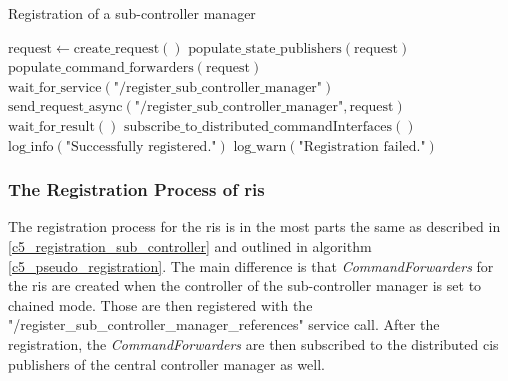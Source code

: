 \begin{algorithm}
	\caption{Registration of a sub-controller manager}
\begin{algorithmic}[1]
  \State $\text{request} \gets \text{create\_request}()$
  \State $\text{populate\_state\_publishers}(\text{request})$
  \State $\text{populate\_command\_forwarders}(\text{request})$
  \State $\text{wait\_for\_service}(\text{"/register\_sub\_controller\_manager"})$
  \State $\text{send\_request\_async}(\text{"/register\_sub\_controller\_manager"}, \text{request})$
  \State $\text{wait\_for\_result}()$
    \State $\text{subscribe\_to\_distributed\_commandInterfaces}()$
    \State $\text{log\_info}(\text{"Successfully registered."})$
  \Else
    \State $\text{log\_warn}(\text{"Registration failed."})$
  \EndIf
\EndProcedure
\end{algorithmic}
\label{c5_pseudo_registration}
\end{algorithm}

\subsubsection{The Registration Process of \Glspl{ri}}
The registration process for the \glspl{ri} is in the most parts the same as described in \autoref{c5_registration_sub_controller} and outlined in algorithm \autoref{c5_pseudo_registration}. The main difference is that \textit{CommandForwarders} for the \glspl{ri} are created when the controller of the sub-controller manager is set to chained mode. Those are then registered with the "/register\_sub\_controller\_manager\_references" service call. After the registration, the \textit{CommandForwarders} are then subscribed to the distributed \glspl{ci} publishers of the central controller manager as well.

